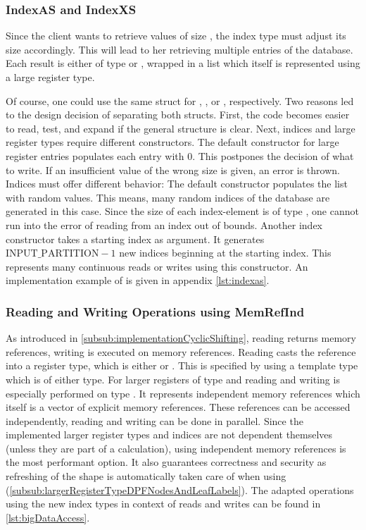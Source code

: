 \subsubsection*{IndexAS and IndexXS} \label{subsub:IndexASandIndexXS}
Since the client wants to retrieve values of size , the index type must adjust its size accordingly.
This will lead to her retrieving multiple entries of the database.
Each result is either of type  or , wrapped in a list which itself is represented using a large register type.

Of course, one could use the same struct for , , or ,  respectively.
Two reasons led to the design decision of separating both structs.
First, the code becomes easier to read, test, and expand if the general structure is clear.
Next, indices and large register types require different constructors.
The default constructor for large register entries populates each entry with $0$.
This postpones the decision of what to write.
If an insufficient value of the wrong size is given, an error is thrown.
Indices must offer different behavior:
The default constructor populates the list with random values.
This means,  many random indices of the database are generated in this case.
Since the size of each index-element is of type , one cannot run into the error of reading from an index out of bounds.
Another index constructor takes a starting index as argument.
It generates $\text{INPUT\_PARTITION} - 1$ new indices beginning at the starting index.
This represents  many continuous reads or writes using this constructor.
An implementation example of  is given in appendix \ref{lst:indexas}.

\subsubsection*{Reading and Writing Operations using MemRefInd} \label{subsub:ReadingWritingUsingMemRefInd} 
As introduced in \ref{subsub:implementationCyclicShifting}, reading returns memory references, writing is executed on memory references.
Reading casts the reference into a register type, which is either  or .
This is specified by using a template type  which is of either type.
For larger registers of type  and  reading and writing is especially performed on type .
It represents independent memory references which itself is a vector of explicit memory references.
These references can be accessed independently, reading and writing can be done in parallel.
Since the implemented larger register types and indices are not dependent themselves (unless they are part of a calculation), using independent memory references is the most performant option.
It also guarantees correctness and security as refreshing of the shape is automatically taken care of when using  (\ref{subsub:largerRegisterTypeDPFNodesAndLeafLabels}).
The adapted operations using the new index types in context of reads and writes can be found in \ref{lst:bigDataAccess}.

